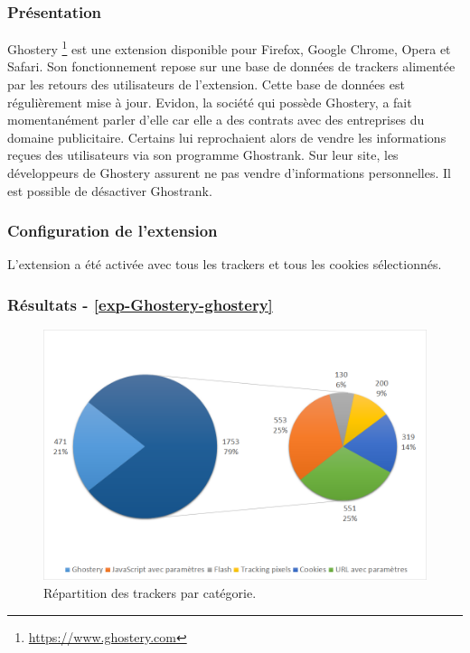 \subsubsection{Présentation}
Ghostery \footnote{\url{https://www.ghostery.com}} est une extension disponible pour Firefox, Google Chrome, Opera et Safari. Son fonctionnement repose sur une base de données de trackers alimentée par les retours des utilisateurs de l'extension. Cette base de données est régulièrement mise à jour. Evidon, la société qui possède Ghostery, a fait momentanément parler d'elle car elle a des contrats avec des entreprises du domaine publicitaire. Certains lui reprochaient alors de vendre les informations reçues des utilisateurs via son programme Ghostrank. Sur leur site, les développeurs de Ghostery assurent ne pas vendre d'informations personnelles. Il est possible de désactiver Ghostrank.

\subsubsection{Configuration de l'extension}
L'extension a été activée avec tous les trackers et tous les cookies sélectionnés.

\subsubsection{Résultats - \autoref{exp-Ghostery-ghostery}}
\begin{figure}[!h]
	\centering
	\includegraphics[scale=.6]{resultats/ANALYSES/Images/Ghostery-Ghostery.png}
	\caption{\label{exp-Ghostery-ghostery}Répartition des trackers par catégorie.}
\end{figure}


